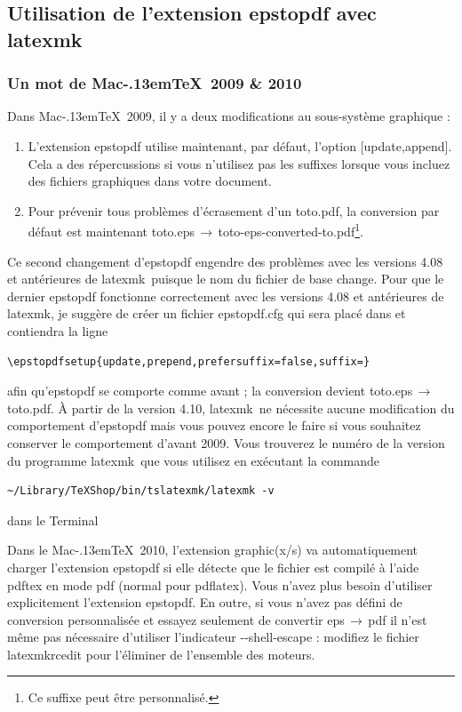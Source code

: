\documentclass[11pt,french]{article}
\newcommand{\MacTeX}{Mac\kern-.13em\TeX}
\newcommand{\latexmk}{\textsf{latexmk}}
\newcommand{\cmd}[1]{\textsf{#1}}
\newcommand{\To}{\,\(\to\)\,}
\begin{document}
\subsection{Utilisation de l'extension \cmd{epstopdf} avec \latexmk}

\subsubsection{Un mot de \MacTeX\ 2009 \& 2010}

Dans \MacTeX\ 2009, il y a deux modifications au sous-système graphique :
\begin{enumerate}
\item 
L'extension \cmd{epstopdf} utilise maintenant, par défaut, l'option \cmd{[update,append]}. Cela a des répercussions si vous n'utilisez pas les suffixes lorsque vous incluez des fichiers graphiques dans votre document.
\item 
Pour prévenir tous problèmes d'écrasement d'un \cmd{toto.pdf}, la conversion par défaut est maintenant \cmd{toto.eps}\To\cmd{toto-eps-converted-to.pdf}\footnote{Ce suffixe peut être personnalisé.}.
\end{enumerate}

Ce second changement d'\cmd{epstopdf} engendre des problèmes avec les versions 4.08 et antérieures de \latexmk\ puisque le nom du fichier de base change. Pour que le dernier \cmd{epstopdf} fonctionne correctement avec les versions 4.08 et antérieures de \latexmk, je suggère de créer un fichier \cmd{epstopdf.cfg} qui sera placé dans  et contiendra la ligne

\begin{verbatim}
\epstopdfsetup{update,prepend,prefersuffix=false,suffix=}
\end{verbatim}
afin qu'\cmd{epstopdf} se comporte comme avant ; la conversion devient \cmd{toto.eps}\To\cmd{toto.pdf}. À partir de la version 4.10, \latexmk\ ne nécessite aucune modification du comportement d'\cmd{epstopdf} mais vous pouvez encore le faire si vous souhaitez conserver le comportement d'avant 2009. Vous trouverez le numéro de la version du programme \latexmk\ que vous utilisez en exécutant la commande

\begin{verbatim}
~/Library/TeXShop/bin/tslatexmk/latexmk -v
\end{verbatim}
dans le \cmd{Terminal}

Dans le \MacTeX\ 2010, l'extension \cmd{graphic(x/s)} va automatiquement charger l'extension \cmd{epstopdf} si elle détecte que le fichier est compilé à l'aide \cmd{pdftex} en mode \cmd{pdf} (normal pour \cmd{pdflatex}). Vous n'avez plus besoin d'utiliser explicitement l'extension \cmd{epstopdf}. En outre, si vous n'avez pas défini de conversion personnalisée et essayez seulement de convertir \cmd{eps}\To\cmd{pdf} il n'est même pas nécessaire d'utiliser l'indicateur \cmd{-{}-shell-escape} : modifiez le fichier \cmd{latexmkrcedit} pour l'éliminer de l'ensemble des moteurs.
\end{document}
